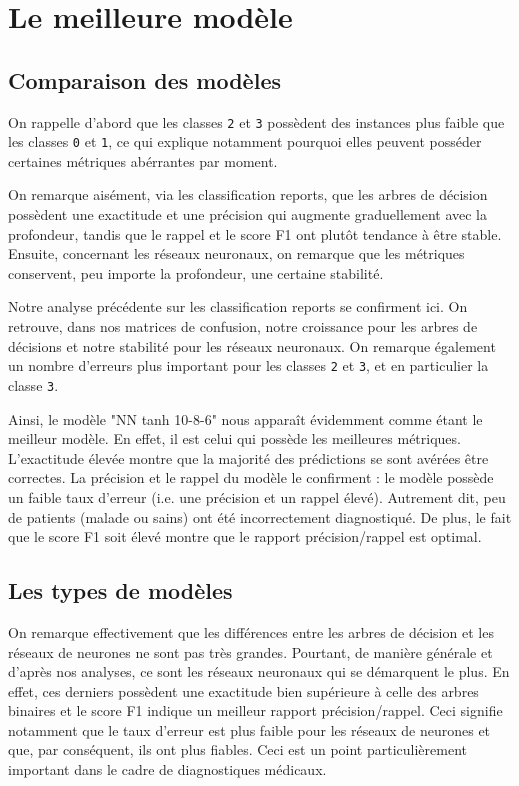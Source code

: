 \chapter{Le meilleure modèle}

\section{Comparaison des modèles}

On rappelle d'abord que les classes \texttt{2} et \texttt{3} possèdent des instances plus faible que les classes \texttt{0} et \texttt{1}, ce qui explique notamment pourquoi elles peuvent posséder certaines métriques abérrantes par moment.

On remarque aisément, via les classification reports, que les arbres de décision possèdent une exactitude et une précision qui augmente graduellement avec la profondeur, tandis que le rappel et le score F1 ont plutôt tendance à être stable. \newline
Ensuite, concernant les réseaux neuronaux, on remarque que les métriques conservent, peu importe la profondeur, une certaine stabilité.

Notre analyse précédente sur les classification reports se confirment ici. On retrouve, dans nos matrices de confusion, notre croissance pour les arbres de décisions et notre stabilité pour les réseaux neuronaux. On remarque également un nombre d'erreurs plus important pour les classes \texttt{2} et \texttt{3}, et en particulier la classe \texttt{3}.

Ainsi, le modèle "NN tanh 10-8-6" nous apparaît évidemment comme étant le meilleur modèle. En effet, il est celui qui possède les meilleures métriques. L'exactitude élevée montre que la majorité des prédictions se sont avérées être correctes. La précision et le rappel du modèle le confirment : le modèle possède un faible taux d'erreur (i.e. une précision et un rappel élevé). Autrement dit, peu de patients (malade ou sains) ont été incorrectement diagnostiqué. De plus, le fait que le score F1 soit élevé montre que le rapport précision/rappel est optimal.

\newpage

\section{Les types de modèles}

On remarque effectivement que les différences entre les arbres de décision et les réseaux de neurones ne sont pas très grandes. Pourtant, de manière générale et d'après nos analyses, ce sont les réseaux neuronaux qui se démarquent le plus. En effet, ces derniers possèdent une exactitude bien supérieure à celle des arbres binaires et le score F1 indique un meilleur rapport précision/rappel. Ceci signifie notamment que le taux d'erreur est plus faible pour les réseaux de neurones et que, par conséquent, ils ont plus fiables. Ceci est un point particulièrement important dans le cadre de diagnostiques médicaux.

